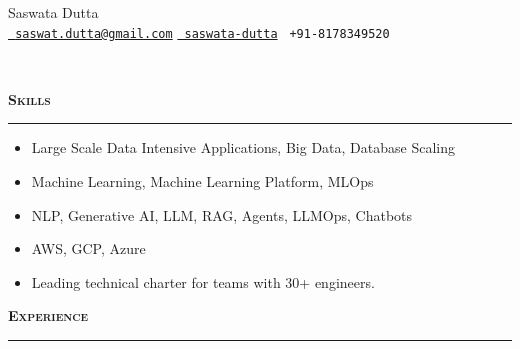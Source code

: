 \documentclass[a4paper,11pt]{article}
\newcommand{\resitem}[1]{\item #1}
\newcommand{\resheading}[1]{
  \hspace{-6pt}
  \begin{minipage}{\textwidth+2pt}
    \textbf{\textsc{\large #1}}
    \vspace{4pt}
    \hrule
  \end{minipage}
}
\begin{document}
\begin{center}
  {\Huge Saswata Dutta}\\
  \href{mailto:saswat.dutta@gmail.com}{\faEnvelope \texttt{ saswat.dutta@gmail.com}}\hspace{1em}
  \href{https://www.linkedin.com/in/saswata-dutta/}{\faLinkedinSquare \texttt{ saswata-dutta}}\hspace{1em}
  {\faPhone \texttt{ +91-8178349520}}\hspace{1em}
\end{center}

\vspace{-8pt}
\noindent\makebox[\linewidth]{\rule{\paperwidth+10em}{0.8pt}}\\


    \indent \resheading{Skills}
        \begin{itemize}[leftmargin=30pt, rightmargin=-16pt]
        \setlength{\itemsep}{-3pt}
        \resitem {Large Scale Data Intensive Applications, Big Data, Database Scaling}
        \resitem {Machine Learning, Machine Learning Platform, MLOps}
        \resitem {NLP, Generative AI, LLM, RAG, Agents, LLMOps, Chatbots}
        \resitem {AWS, GCP, Azure}
        \resitem{Leading technical charter for teams with 30+ engineers.}
    \end{itemize}
    
    \indent \resheading{Experience}
\end{document}
